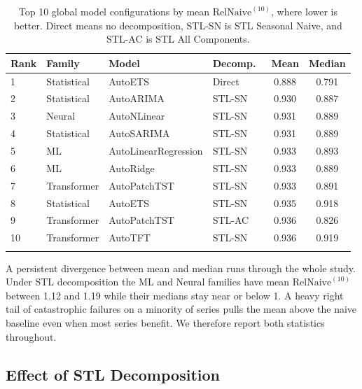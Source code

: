 \documentclass[pdflatex,sn-mathphys-num]{sn-jnl}
\theoremstyle{thmstyleone}
\theoremstyle{thmstyletwo}
\theoremstyle{thmstylethree}
\begin{document}
\begin{table}[ht]
\caption{Top 10 global model configurations by mean $\mathrm{RelNaive}^{(10)}$,
where lower is better. Direct means no decomposition, STL-SN is STL Seasonal
Naive, and STL-AC is STL All Components.}\label{tab:top10}
\begin{tabular*}{\textwidth}{@{\extracolsep\fill}llllcc}
\toprule
Rank & Family & Model & Decomp.\ & Mean & Median \\
\midrule
1  & Statistical  & AutoETS               & Direct  & 0.888 & 0.791 \\
2  & Statistical  & AutoARIMA             & STL-SN  & 0.930 & 0.887 \\
3  & Neural       & AutoNLinear           & STL-SN  & 0.931 & 0.889 \\
4  & Statistical  & AutoSARIMA            & STL-SN  & 0.931 & 0.889 \\
5  & ML           & AutoLinearRegression  & STL-SN  & 0.933 & 0.893 \\
6  & ML           & AutoRidge             & STL-SN  & 0.933 & 0.889 \\
7  & Transformer  & AutoPatchTST          & STL-SN  & 0.933 & 0.891 \\
8  & Statistical  & AutoETS               & STL-SN  & 0.935 & 0.918 \\
9  & Transformer  & AutoPatchTST          & STL-AC  & 0.936 & 0.826 \\
10 & Transformer  & AutoTFT               & STL-SN  & 0.936 & 0.919 \\
\botrule
\end{tabular*}
\end{table}

A persistent divergence between mean and median runs through the whole study.
Under STL decomposition the ML and Neural families have mean
$\mathrm{RelNaive}^{(10)}$ between 1.12 and 1.19 while their medians stay near
or below 1. A heavy right tail of catastrophic failures on a minority of
series pulls the mean above the naive baseline even when most series benefit.
We therefore report both statistics throughout.

\subsection{Effect of STL Decomposition}\label{sec:stl_results}
\end{document}
